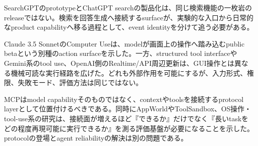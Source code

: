 SearchGPTのprototypeとChatGPT searchの製品化は、同じ検索機能の一枚岩のreleaseではない。検索を回答生成へ接続するsurfaceが、実験的な入口から日常的なproduct capabilityへ移る過程として、event identityを分けて追う必要がある。\autocite{src-6cafd8cf5668,src-bd5105ccfa25}


Claude 3.5 SonnetのComputer Useは、modelが画面上の操作へ踏み込むpublic betaという別種のaction surfaceを示した。一方、structured tool interfaceやGemini系のtool use、OpenAI側のRealtime/API周辺更新は、GUI操作とは異なる機械可読な実行経路を広げた。どれも外部作用を可能にするが、入力形式、権限、失敗モード、評価方法は同じではない。\autocite{src-9e4ef9c155b6,src-a38408fd5407,src-e283b9c34207,src-ed98251ab05d}


MCPはmodel capabilityそのものではなく、contextやtoolsを接続するprotocol layerとして位置付けるべきである。同時にAppWorldやToolSandbox、OS操作・tool-use系の研究は、接続面が増えるほど『できるか』だけでなく『長いtaskをどの程度再現可能に実行できるか』を測る評価基盤が必要になることを示した。protocolの登場とagent reliabilityの解決は別の問題である。\autocite{src-0d67af76cfef,src-395ebe20f9b0,src-5ad3266ea448,src-7afacff558f5}


